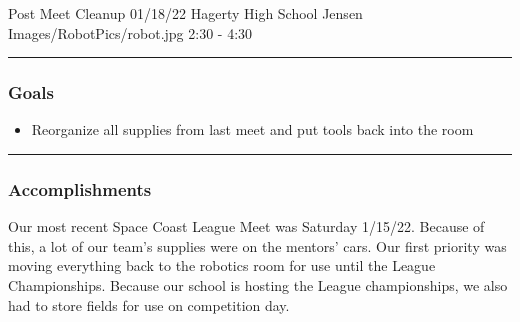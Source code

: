 \insertmeeting 
  {Post Meet Cleanup} 
  {01/18/22} 
  {Hagerty High School}
  {Jensen}
  {Images/RobotPics/robot.jpg}
  {2:30 - 4:30}
  
\noindent\hfil\rule{\textwidth}{.4pt}\hfil
\subsubsection*{Goals}
\begin{itemize}
    \item Reorganize all supplies from last meet and put tools back into the room

\end{itemize} 

\noindent\hfil\rule{\textwidth}{.4pt}\hfil

\subsubsection*{Accomplishments}
Our most recent Space Coast League Meet was Saturday 1/15/22. Because of this, a lot of our team's supplies were on the mentors' cars. Our first priority was moving everything back to the robotics room for use until the League Championships. Because our school is hosting the League championships, we also had to store fields for use on competition day. 



